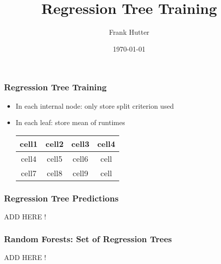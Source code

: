 \documentclass{beamer}
\begin{document}
\title{Regression Tree Training}   
\author{Frank Hutter}
\date{\today} 

\frame
{
\titlepage
} 

\frame
{
\frametitle{Regression Tree Training}

\begin{itemize}
\item In each internal node: only store split criterion used
\item In each leaf: store mean of runtimes

\begin{center}
\begin{tabular}{ |c|c|c||c| } 
 \hline
 cell1 & cell2 & cell3 & cell4 \\ 
 \hline
 cell4 & cell5 & cell6 & cell \\ 
 cell7 & cell8 & cell9 & cell \\ 
 \hline
\end{tabular}
\end{center}


\end{itemize}


} 



\frame
{
\frametitle{Regression Tree Predictions} 

ADD HERE !
}

\frame
{ 
\frametitle{Random Forests: Set of Regression Trees}

 ADD HERE !
}
\end{document}
